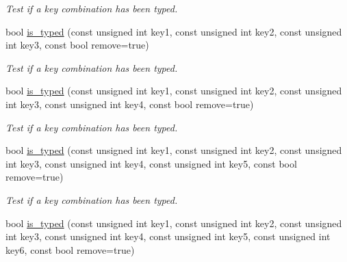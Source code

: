 \begin{DoxyCompactItemize}
\begin{DoxyCompactList}\small\item\em Test if a key combination has been typed. \item\end{DoxyCompactList}\item 
\hypertarget{structcimg__library_1_1_c_img_display_a94b25f7ed7a6e92949f8a474d760e7d8}{
bool \hyperlink{structcimg__library_1_1_c_img_display_a94b25f7ed7a6e92949f8a474d760e7d8}{is\_\-typed} (const unsigned int key1, const unsigned int key2, const unsigned int key3, const bool remove=true)}
\label{structcimg__library_1_1_c_img_display_a94b25f7ed7a6e92949f8a474d760e7d8}

\begin{DoxyCompactList}\small\item\em Test if a key combination has been typed. \item\end{DoxyCompactList}\item 
\hypertarget{structcimg__library_1_1_c_img_display_a993cf56e37ffd82a1f72d5cf4821fefb}{
bool \hyperlink{structcimg__library_1_1_c_img_display_a993cf56e37ffd82a1f72d5cf4821fefb}{is\_\-typed} (const unsigned int key1, const unsigned int key2, const unsigned int key3, const unsigned int key4, const bool remove=true)}
\label{structcimg__library_1_1_c_img_display_a993cf56e37ffd82a1f72d5cf4821fefb}

\begin{DoxyCompactList}\small\item\em Test if a key combination has been typed. \item\end{DoxyCompactList}\item 
\hypertarget{structcimg__library_1_1_c_img_display_a65c9583febe75ae98fa8a3f255f26e82}{
bool \hyperlink{structcimg__library_1_1_c_img_display_a65c9583febe75ae98fa8a3f255f26e82}{is\_\-typed} (const unsigned int key1, const unsigned int key2, const unsigned int key3, const unsigned int key4, const unsigned int key5, const bool remove=true)}
\label{structcimg__library_1_1_c_img_display_a65c9583febe75ae98fa8a3f255f26e82}

\begin{DoxyCompactList}\small\item\em Test if a key combination has been typed. \item\end{DoxyCompactList}\item 
\hypertarget{structcimg__library_1_1_c_img_display_a2b2ffda4bbcb192a05698741f5983565}{
bool \hyperlink{structcimg__library_1_1_c_img_display_a2b2ffda4bbcb192a05698741f5983565}{is\_\-typed} (const unsigned int key1, const unsigned int key2, const unsigned int key3, const unsigned int key4, const unsigned int key5, const unsigned int key6, const bool remove=true)}
\label{structcimg__library_1_1_c_img_display_a2b2ffda4bbcb192a05698741f5983565}


\end{DoxyCompactItemize}
